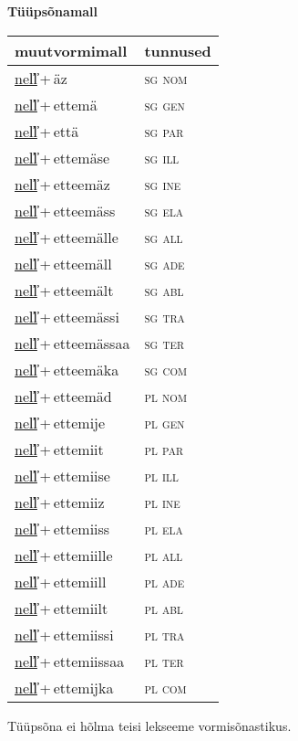 
\vspace{1.8em}
\begin{minipage}{\textwidth}
\textbf{Tüüpsõnamall \,}\\

\begin{sideways}
\begin{tabular}{l l}
muutvormimall & tunnused \\
\hline
\underline{nel̕l̕}\,+\,äz & \textsc{ sg nom } \\
\underline{nel̕l̕}\,+\,ettemä & \textsc{ sg gen } \\
\underline{nel̕l̕}\,+\,että & \textsc{ sg par } \\
\underline{nel̕l̕}\,+\,ettemäse & \textsc{ sg ill } \\
\underline{nel̕l̕}\,+\,etteemäz & \textsc{ sg ine } \\
\underline{nel̕l̕}\,+\,etteemäss & \textsc{ sg ela } \\
\underline{nel̕l̕}\,+\,etteemälle & \textsc{ sg all } \\
\underline{nel̕l̕}\,+\,etteemäll & \textsc{ sg ade } \\
\underline{nel̕l̕}\,+\,etteemält & \textsc{ sg abl } \\
\underline{nel̕l̕}\,+\,etteemässi & \textsc{ sg tra } \\
\underline{nel̕l̕}\,+\,etteemässaa & \textsc{ sg ter } \\
\underline{nel̕l̕}\,+\,etteemäka & \textsc{ sg com } \\
\underline{nel̕l̕}\,+\,etteemäd & \textsc{ pl nom } \\
\underline{nel̕l̕}\,+\,ettemije & \textsc{ pl gen } \\
\underline{nel̕l̕}\,+\,ettemiit & \textsc{ pl par } \\
\underline{nel̕l̕}\,+\,ettemiise & \textsc{ pl ill } \\
\underline{nel̕l̕}\,+\,ettemiiz & \textsc{ pl ine } \\
\underline{nel̕l̕}\,+\,ettemiiss & \textsc{ pl ela } \\
\underline{nel̕l̕}\,+\,ettemiille & \textsc{ pl all } \\
\underline{nel̕l̕}\,+\,ettemiill & \textsc{ pl ade } \\
\underline{nel̕l̕}\,+\,ettemiilt & \textsc{ pl abl } \\
\underline{nel̕l̕}\,+\,ettemiissi & \textsc{ pl tra } \\
\underline{nel̕l̕}\,+\,ettemiissaa & \textsc{ pl ter } \\
\underline{nel̕l̕}\,+\,ettemijka & \textsc{ pl com } \\
\end{tabular}
\end{sideways}
\label{tab:tüüpsõnamall-nel̕l̕äz}

\end{minipage}

 
\vspace{1em}
\noindent Tüüpsõna ei hõlma teisi lekseeme vormi\-sõnastikus.
